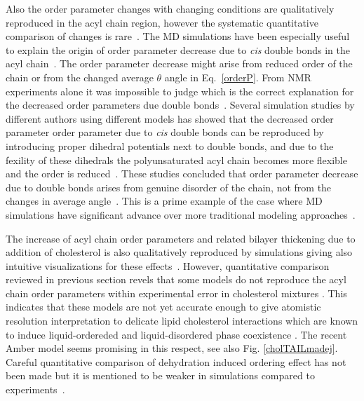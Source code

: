 \documentclass[aps,prl,superscriptaddress,twocolumn]{revtex4}
\begin{document}
Also the order parameter changes with changing conditions are qualitatively reproduced in the acyl chain region, 
however the systematic quantitative comparison of changes is rare~\cite{ollila07a,ferreira13,madej15}.
The MD simulations have been especially useful to explain the origin of order parameter decrease
due to {\it cis} double bonds in the acyl chain~\cite{feller02,huber02,eldho03,stillwell03,gawrisch03,bachar04,ollila07a}. The order parameter decrease might arise
from reduced order of the chain or from the changed average $\theta$ angle in Eq.~\ref{orderP}.
From NMR experiments alone it was impossible to judge which is the correct explanation for
the decreased order parameters due double bonds~\cite{feller02,huber02,eldho03,stillwell03,gawrisch03}. Several simulation studies by different
authors using different models has showed that the decreased order parameter order parameter due to {\it cis} double
bonds can be reproduced by introducing proper dihedral potentials next to double bonds,
and due to the fexility of these dihedrals the polyunsaturated acyl chain becomes more flexible and
the order is reduced~\cite{feller02,eldho03,stillwell03,gawrisch03,bachar04,ollila07a}. 
These studies concluded that order parameter decrease due to double 
bonds arises from genuine disorder of the chain, not from the changes in average angle~\cite{stillwell03,gawrisch03}.
This is a prime example of the case where MD simulations have significant advance over more traditional 
modeling approaches~\cite{stillwell03}.

The increase of acyl chain order parameters and related bilayer thickening due to addition of cholesterol 
is also qualitatively reproduced by simulations giving also intuitive visualizations for these effects~\cite{??,ferreira13,madej15}. 
However, quantitative comparison reviewed in previous section revels that some models do not reproduce the 
acyl chain order parameters within experimental error in cholesterol mixtures \cite{lim12,ferreira13}.
This indicates that these models are not yet accurate enough to give atomistic resolution interpretation
to delicate lipid cholesterol interactions which are known to induce liquid-ordereded and liquid-disordered
phase coexistence \cite{ipsen87}. The recent Amber model \cite{madej15} seems promising in this respect, see also Fig. \ref{cholTAILmadej}. 
Careful quantitative comparison of dehydration induced ordering effect has not been made but it is mentioned to be 
weaker in simulations compared to experiments~\cite{hogberg06}. 
\end{document}
